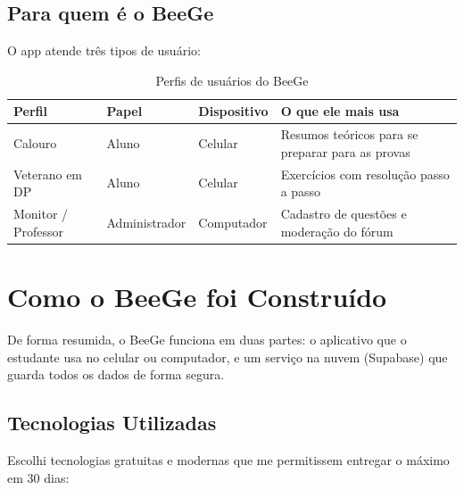 \documentclass[12pt, a4paper]{article}
\begin{document}
\subsection{Para quem \'{e} o BeeGe}

O app atende tr\^{e}s tipos de usu\'{a}rio:

\begin{table}[H]
\centering
\small
\renewcommand{\arraystretch}{1.15}
\caption{Perfis de usu\'{a}rios do BeeGe}
\begin{tabularx}{\textwidth}{l l l X}
\toprule
\textbf{Perfil} & \textbf{Papel} & \textbf{Dispositivo} & \textbf{O que ele mais usa} \\
\midrule
Calouro & Aluno & Celular & Resumos te\'{o}ricos para se preparar para as provas \\
Veterano em DP & Aluno & Celular & Exerc\'{i}cios com resolu\c{c}\~{a}o passo a passo \\
Monitor / Professor & Administrador & Computador & Cadastro de quest\~{o}es e modera\c{c}\~{a}o do f\'{o}rum \\
\bottomrule
\end{tabularx}
\end{table}

\section{Como o BeeGe foi Constru\'{i}do}

De forma resumida, o BeeGe funciona em duas partes: o aplicativo que o estudante usa no celular ou computador, e um servi\c{c}o na nuvem (Supabase) que guarda todos os dados de forma segura.

\subsection{Tecnologias Utilizadas}

Escolhi tecnologias gratuitas e modernas que me permitissem entregar o m\'{a}ximo em 30 dias:
\end{document}
